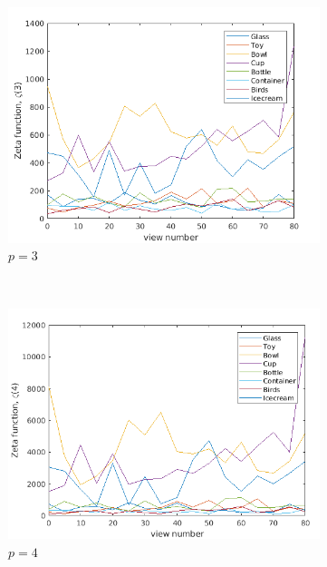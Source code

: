 \documentclass[10pt,a4paper]{article}
\theoremstyle{plain}
\theoremstyle{definition}
\begin{document}
\begin{figure}[H]
	\begin{subfigure}[b]{0.5\textwidth}
		\includegraphics[width= \textwidth]{images/zeta-viewnump3.png}
		\caption{$p=3$}
		\label{}
	\end{subfigure}~
	\begin{subfigure}[b]{0.5\textwidth}
		\includegraphics[width= \textwidth]{images/zeta-viewnump4.png}
		\caption{$p=4$}
		\label{}
	\end{subfigure}
	\caption{ }
	\label{}
\end{figure}
\end{document}
